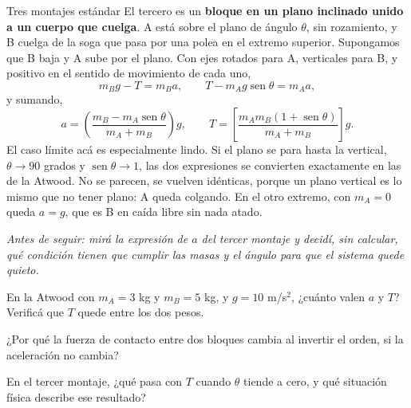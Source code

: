 \documentclass[11pt,openany]{book}
\newcommand{\sen}{\operatorname{sen}}
\begin{document}
\begin{bloque}{Tres montajes estándar}
El tercero es un \textbf{bloque en un plano inclinado unido a un cuerpo que cuelga}. A está sobre el plano de ángulo $\theta$, sin rozamiento, y B cuelga de la soga que pasa por una polea en el extremo superior. Supongamos que B baja y A sube por el plano. Con ejes rotados para A, verticales para B, y positivo en el sentido de movimiento de cada uno,
\[
m_B g - T = m_B a ,
\qquad
T - m_A g \sen\theta = m_A a ,
\]
y sumando,
\[
a = \left(\frac{m_B - m_A \sen\theta}{m_A + m_B}\right) g ,
\qquad
T = \left[\frac{m_A m_B (1 + \sen\theta)}{m_A + m_B}\right] g .
\]
El caso límite acá es especialmente lindo. Si el plano se para hasta la vertical, $\theta \to 90$ grados y $\sen\theta \to 1$, las dos expresiones se convierten exactamente en las de la Atwood. No se parecen, se vuelven idénticas, porque un plano vertical es lo mismo que no tener plano: A queda colgando. En el otro extremo, con $m_A = 0$ queda $a = g$, que es B en caída libre sin nada atado.

\textit{Antes de seguir: mirá la expresión de $a$ del tercer montaje y decidí, sin calcular, qué condición tienen que cumplir las masas y el ángulo para que el sistema quede quieto.}
\end{bloque}

\begin{chequeo}
\item En la Atwood con $m_A = 3$ kg y $m_B = 5$ kg, y $g = 10$ m/s$^2$, ¿cuánto valen $a$ y $T$? Verificá que $T$ quede entre los dos pesos.
\item ¿Por qué la fuerza de contacto entre dos bloques cambia al invertir el orden, si la aceleración no cambia?
\item En el tercer montaje, ¿qué pasa con $T$ cuando $\theta$ tiende a cero, y qué situación física describe ese resultado?
\end{chequeo}
\end{document}
